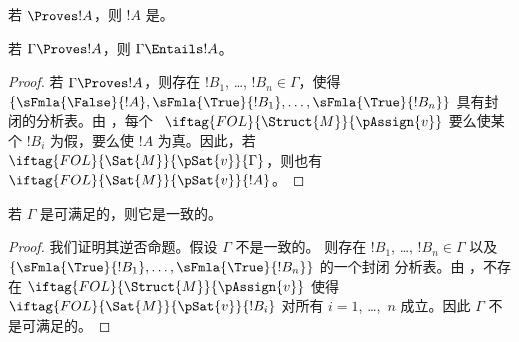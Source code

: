 \documentclass[../../../include/open-logic-section]{subfiles}
\begin{document}
\begin{cor}
若 $\Proves !A$，则 $!A$ 是。
\end{cor}

\begin{cor}
若 $\Gamma \Proves !A$，则 $\Gamma \Entails !A$。
\end{cor}

\begin{proof}
  若 $\Gamma \Proves !A$，则存在 $!B_1$, \dots, $!B_n \in
  \Gamma$，使得 $\{\sFmla{\False}{!A}, \sFmla{\True}{!B_1}, \dots,
  \sFmla{\True}{!B_n}\}$ 具有封闭的分析表。由
  ，每个
  ~$\iftag{FOL}{\Struct{M}}{\pAssign{v}}$
  要么使某个 $!B_i$ 为假，要么使 $!A$ 为真。因此，若
  $\iftag{FOL}{\Sat{M}}{\pSat{v}}{\Gamma}$，则也有
  $\iftag{FOL}{\Sat{M}}{\pSat{v}}{!A}$。
\end{proof}

\begin{cor}
若 $\Gamma$ 是可满足的，则它是一致的。
\end{cor}

\begin{proof}
我们证明其逆否命题。假设 $\Gamma$ 不是一致的。
则存在 $!B_1$, \dots, $!B_n \in \Gamma$ 以及 $\{\sFmla{\True}{!B_1}, \dots, \sFmla{\True}{!B_n}\}$ 的一个封闭
分析表。由 ，不存在
$\iftag{FOL}{\Struct{M}}{\pAssign{v}}$ 使得
$\iftag{FOL}{\Sat{M}}{\pSat{v}}{!B_i}$ 对所有 $i=1$, \dots,~$n$ 成立。因此
$\Gamma$ 不是可满足的。
\end{proof}
\end{document}

